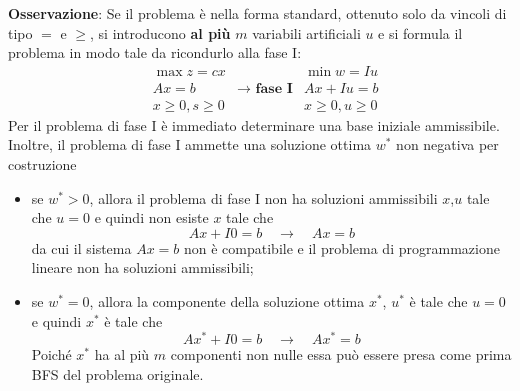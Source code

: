 \documentclass[a4paper]{extarticle}
\begin{document}
\vspace{1em}
\noindent
\textbf{Osservazione}: Se il problema è nella forma standard, ottenuto solo da vincoli di tipo $=$ e $\geq$, si introducono \textbf{al più} $m$ variabili artificiali $u$ e si formula il problema in modo tale da ricondurlo alla fase I:
\begin{align*}
    &\max z = cx&&\min w = Iu\\
    &Ax = b& \rightarrow \textbf{ fase I}&Ax + Iu=b\\
    &x \geq 0, s \geq 0&&x \geq0, u \geq 0
\end{align*}
Per il problema di fase I è immediato determinare una base iniziale ammissibile.\\
Inoltre, il problema di fase I ammette una soluzione ottima $w^*$ non negativa per costruzione
\begin{itemize}
    \item se $w^* > 0$, allora il problema di fase I non ha soluzioni ammissibili $x$,$u$ tale che $u=0$ e quindi non esiste $x$ tale che
    \[Ax+I0=b \hspace{1em} \rightarrow \hspace{1em} Ax=b\]
    da cui il sistema $Ax = b$ non è compatibile e il problema di programmazione lineare non ha soluzioni ammissibili;
    \item se $w^* = 0$, allora la componente della soluzione ottima $x^*$, $u^*$ è tale che $u=0$ e quindi $x^*$ è tale che
    \[Ax^*+I0=b \hspace{1em} \rightarrow \hspace{1em} Ax^*=b\]
    Poiché $x^*$ ha al più $m$ componenti non nulle essa può essere presa come prima BFS del problema originale.
\end{itemize}
\end{document}
